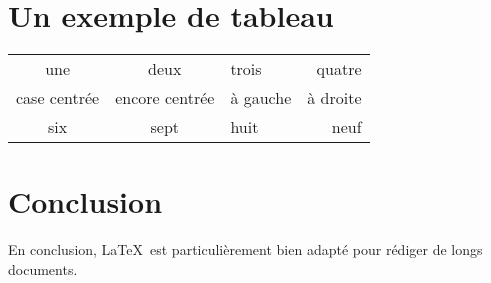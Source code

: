 \documentclass{article}           %
\begin{document}
\section{Un exemple de tableau}
\begin{tabular}{|*{2}{c|}l r|}
   \hline
   une & deux & trois & quatre \\
   case centrée & encore centrée & à gauche & à droite \\
   \hline
   six & sept & huit & neuf \\
   \hline
\end{tabular}
\section{Conclusion}               %
En conclusion, \LaTeX\ est 
particulièrement bien adapté pour 
rédiger de longs documents.
 											 

\end{document}
